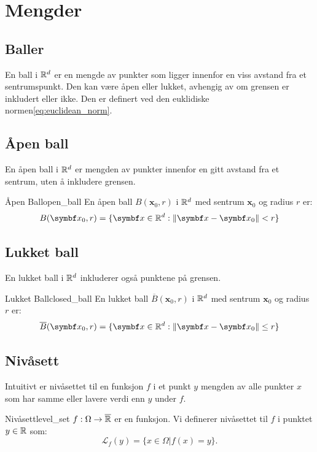 \section{Mengder}

\subsection{Baller}
En ball i \(\mathbb{R}^d\) er en mengde av punkter som ligger innenfor en viss avstand fra et sentrumspunkt. Den kan være åpen eller lukket, avhengig av om grensen er inkludert eller ikke.
Den er definert ved den euklidiske normen\eqref{eq:euclidean_norm}.
\subsection{Åpen ball}
En åpen ball i \(\mathbb{R}^d\) er mengden av punkter innenfor en gitt avstand fra et sentrum, uten å inkludere grensen.

\begin{definition}{Åpen Ball}{open_ball}
	En åpen ball \(B(\mathbf{x}_0, r)\) i \(\mathbb{R}^d\) med sentrum \(\mathbf{x}_0\) og radius \(r\) er:
	\[
		B(\mathbf{x}_0, r) = \{ \mathbf{x} \in \R^d : \norm{\mathbf{x} - \mathbf{x}_0} < r \}
	\]
\end{definition}

\subsection{Lukket ball}
En lukket ball i \(\mathbb{R}^d\) inkluderer også punktene på grensen.

\begin{definition}{Lukket Ball}{closed_ball}
	En lukket ball \(\overline{B}(\mathbf{x}_0, r)\) i \(\mathbb{R}^d\) med sentrum \(\mathbf{x}_0\) og radius \(r\) er:
	\[
		\overline{B}(\mathbf{x}_0, r) = \{ \mathbf{x} \in \R^d : \norm{\mathbf{x} - \mathbf{x}_0} \leq r \}
	\]
\end{definition}

\subsection{Nivåsett}
Intuitivt er nivåsettet til en funksjon \( f \) i et punkt \( y \) mengden av alle punkter \( x \) som har samme eller lavere verdi enn \( y \) under \( f \).
\begin{definition}{Nivåsett}{level_set}
	\(f: \Omega \to \overline{\mathbb{R}}\) er en funksjon. Vi definerer nivåsettet til \(f\) i punktet \(y \in \mathbb{R}\) som:
	\[
		\mathcal{L}_f(y) = \{x \in \Omega | f(x) = y\}.
	\]
\end{definition}


